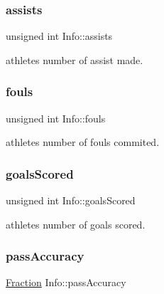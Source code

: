 \subsubsection{\texorpdfstring{assists}{assists}}
{\footnotesize\ttfamily unsigned int Info\+::assists\hspace{0.3cm}{\ttfamily [protected]}}



athlete\textquotesingle{}s number of assist made. 

\hypertarget{class_info_a2f90c84ba67c0e225dd58cdc14ab7f3d}{}\label{class_info_a2f90c84ba67c0e225dd58cdc14ab7f3d} 
\subsubsection{\texorpdfstring{fouls}{fouls}}
{\footnotesize\ttfamily unsigned int Info\+::fouls\hspace{0.3cm}{\ttfamily [protected]}}



athlete\textquotesingle{}s number of fouls commited. 

\hypertarget{class_info_a5ad5f72833856502b9c1f6ea50a98619}{}\label{class_info_a5ad5f72833856502b9c1f6ea50a98619} 
\subsubsection{\texorpdfstring{goals\+Scored}{goalsScored}}
{\footnotesize\ttfamily unsigned int Info\+::goals\+Scored\hspace{0.3cm}{\ttfamily [protected]}}



athlete\textquotesingle{}s number of goals scored. 

\hypertarget{class_info_a37ee53dc8ae9a9656206e7eb389c6392}{}\label{class_info_a37ee53dc8ae9a9656206e7eb389c6392} 
\subsubsection{\texorpdfstring{pass\+Accuracy}{passAccuracy}}
{\footnotesize\ttfamily \hyperlink{class_fraction}{Fraction} Info\+::pass\+Accuracy\hspace{0.3cm}{\ttfamily [protected]}}



